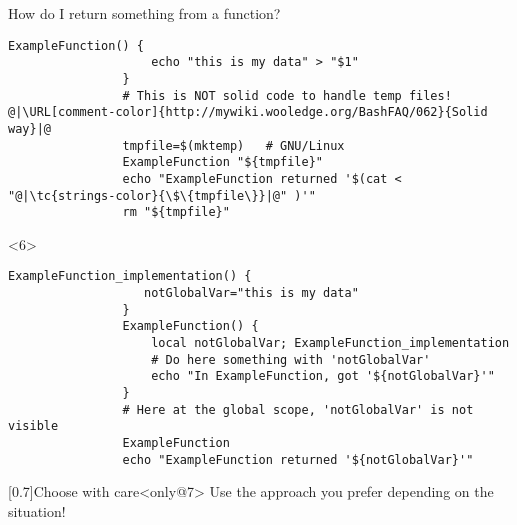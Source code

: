 \begin{frame}[fragile]{How do I return something from a function?}
\begin{overlayarea}{\textwidth}{0.7\textheight}
\begin{onlyenv}
\begin{lstlisting}[style=MyBash, numbers=none]
                ExampleFunction() {
                    echo "this is my data" > "$1"
                }
                # This is NOT solid code to handle temp files! @|\URL[comment-color]{http://mywiki.wooledge.org/BashFAQ/062}{Solid way}|@
                tmpfile=$(mktemp)   # GNU/Linux
                ExampleFunction "${tmpfile}"
                echo "ExampleFunction returned '$(cat < "@|\tc{strings-color}{\$\{tmpfile\}}|@" )'"
                rm "${tmpfile}"
            \end{lstlisting}
        \end{onlyenv}
        \begin{onlyenv}<6>
            \begin{lstlisting}[style=MyBash, numbers=none, emph={[7]notGlobalVar},]
                ExampleFunction_implementation() {
                   notGlobalVar="this is my data"
                }
                ExampleFunction() {
                    local notGlobalVar; ExampleFunction_implementation
                    # Do here something with 'notGlobalVar'
                    echo "In ExampleFunction, got '${notGlobalVar}'"
                }
                # Here at the global scope, 'notGlobalVar' is not visible
                ExampleFunction
                echo "ExampleFunction returned '${notGlobalVar}'"
            \end{lstlisting}
        \end{onlyenv}
        \vspace{-1mm}
        \begin{varblock}{}[0.7\textwidth]{Choose with care}<only@7>
            Use the approach you prefer depending on the situation!
        \end{varblock}
    \end{overlayarea}
\end{frame}
